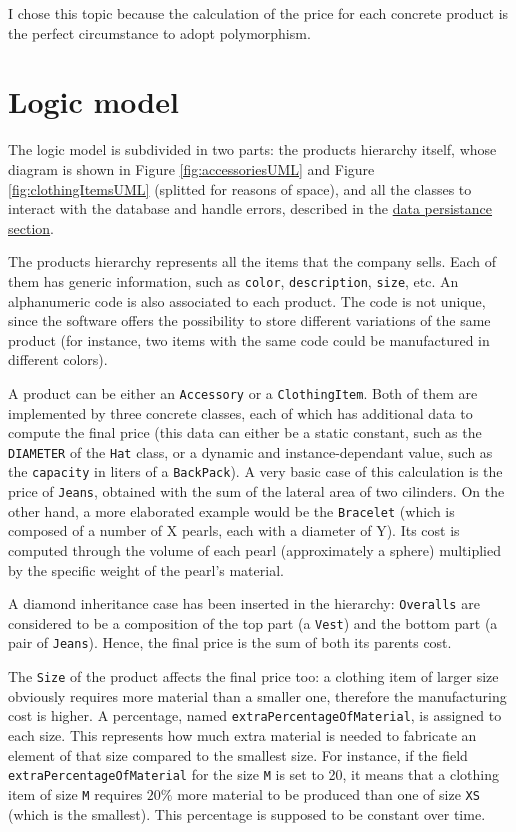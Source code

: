 \documentclass[10pt]{article}
\begin{document}
I chose this topic because the calculation of the price for each concrete
product is the perfect circumstance to adopt polymorphism.

\section{Logic model}
The logic model is subdivided in two parts: the products hierarchy itself,
whose diagram is shown in Figure \ref{fig:accessoriesUML} and Figure
\ref{fig:clothingItemsUML} (splitted for reasons of space), and all the classes
to interact with the database and handle errors, described in the
\hyperref[sec:dataPersistance]{data persistance section}.

The products hierarchy represents all the items that the company sells. Each of
them has generic information, such as \texttt{color}, \texttt{description},
\texttt{size}, etc. An alphanumeric code is also associated to each product.
The code is not unique, since the software offers the possibility to store
different variations of the same product (for instance, two items with the same
code could be manufactured in different colors).

A product can be either an \texttt{Accessory} or a \texttt{ClothingItem}. Both
of them are implemented by three concrete classes, each of which has additional
data to compute the final price (this data can either be a static constant,
such as the \texttt{DIAMETER} of the \texttt{Hat} class, or a dynamic and
instance-dependant value, such as the \texttt{capacity} in liters of a
\texttt{BackPack}). A very basic case of this calculation is the price of
\texttt{Jeans}, obtained with the sum of the lateral area of two cilinders. On
the other hand, a more elaborated example would be the \texttt{Bracelet} (which
is composed of a number of X pearls, each with a diameter of Y). Its cost is
computed through the volume of each pearl (approximately a sphere) multiplied
by the specific weight of the pearl's material.

A diamond inheritance case has been inserted in the hierarchy:
\texttt{Overalls} are considered to be a composition of the top part (a
\texttt{Vest}) and the bottom part (a pair of \texttt{Jeans}). Hence, the final
price is the sum of both its parents cost.

The \texttt{Size} of the product affects the final price too: a clothing item
of larger size obviously requires more material than a smaller one, therefore
the manufacturing cost is higher. A percentage, named
\texttt{extraPercentageOfMaterial}, is assigned to each size. This represents
how much extra material is needed to fabricate an element of that size compared
to the smallest size. For instance, if the field
\texttt{extraPercentageOfMaterial} for the size \texttt{M} is set to 20, it
means that a clothing item of size \texttt{M} requires $20\%$ more material to
be produced than one of size \texttt{XS} (which is the smallest). This
percentage is supposed to be constant over time.
\end{document}
